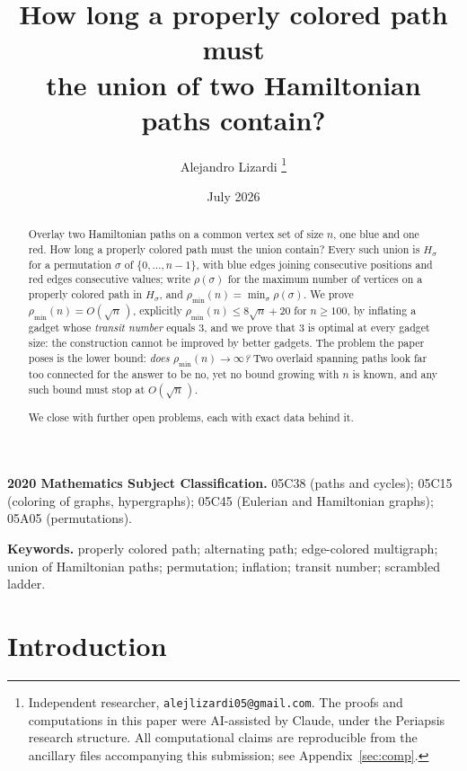 \documentclass[11pt]{article}
\title{How long a properly colored path must\\
the union of two Hamiltonian paths contain?}
\author{Alejandro Lizardi%
\thanks{Independent researcher, \texttt{alejlizardi05@gmail.com}.
The proofs and computations in this paper were AI-assisted by Claude, under the
Periapsis research structure. All computational claims are reproducible from the
ancillary files accompanying this submission; see Appendix~\ref{sec:comp}.}}
\date{July 2026}
\theoremstyle{definition}
\newcommand{\pmin}{\rho_{\min}}
\begin{document}
\maketitle

\begin{abstract}
Overlay two Hamiltonian paths on a common vertex set of size $n$, one blue and one
red. How long a properly colored path must the union contain? Every such union is
$H_\sigma$ for a permutation $\sigma$ of
$\{0,\dots,n-1\}$, with blue edges joining consecutive positions and red edges
consecutive values; write $\rho(\sigma)$ for the maximum number of vertices on a
properly colored path in $H_\sigma$, and $\pmin(n) = \min_\sigma \rho(\sigma)$. We
prove $\pmin(n) = O(\sqrt n\,)$, explicitly $\pmin(n) \le 8\sqrt n + 20$ for
$n \ge 100$, by inflating a gadget whose \emph{transit number} equals $3$, and we
prove that $3$ is optimal at every gadget size: the construction cannot be improved
by better gadgets. The problem the paper poses is the lower bound: \emph{does
$\pmin(n) \to \infty$?} Two overlaid spanning paths look far too connected for the
answer to be no, yet no bound growing with $n$ is known, and any such bound must
stop at $O(\sqrt n\,)$.

We close with further open problems, each with exact data behind it.
\end{abstract}

\medskip
\noindent\textbf{2020 Mathematics Subject Classification.}
05C38 (paths and cycles);
05C15 (coloring of graphs, hypergraphs);
05C45 (Eulerian and Hamiltonian graphs);
05A05 (permutations).

\noindent\textbf{Keywords.}
properly colored path; alternating path; edge-colored multigraph; union of Hamiltonian
paths; permutation; inflation; transit number; scrambled ladder.

\section{Introduction}\label{sec:intro}
\end{document}
